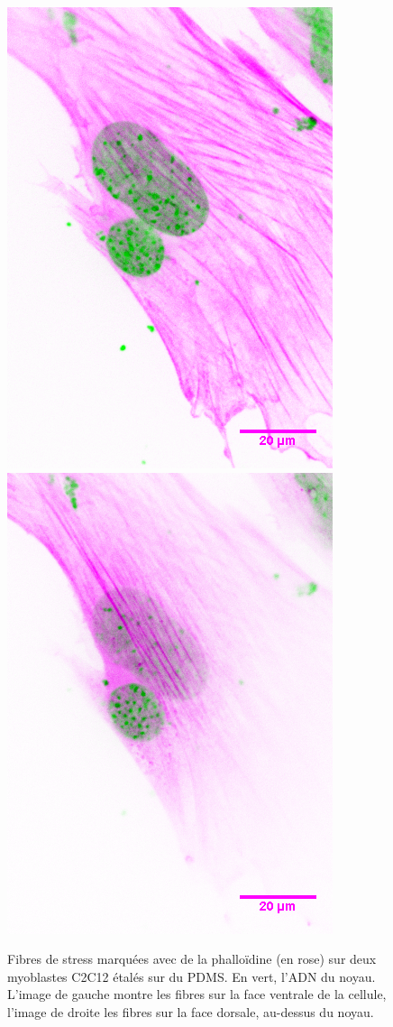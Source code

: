 \begin{figure}
\includegraphics[scale=0.4]{Figures/Fibres_de_stress_dessous_impress.png} \includegraphics[scale=0.4]{Figures/Fibres_de_stress_dessus_impress.png} 
\caption{Fibres de stress marquées avec de la phalloïdine (en rose) sur deux myoblastes C2C12 étalés sur du PDMS. En vert, l'ADN du noyau. L'image de gauche montre les fibres sur la face ventrale de la cellule, l'image de droite les fibres sur la face dorsale, au-dessus du noyau. }
\end{figure}
